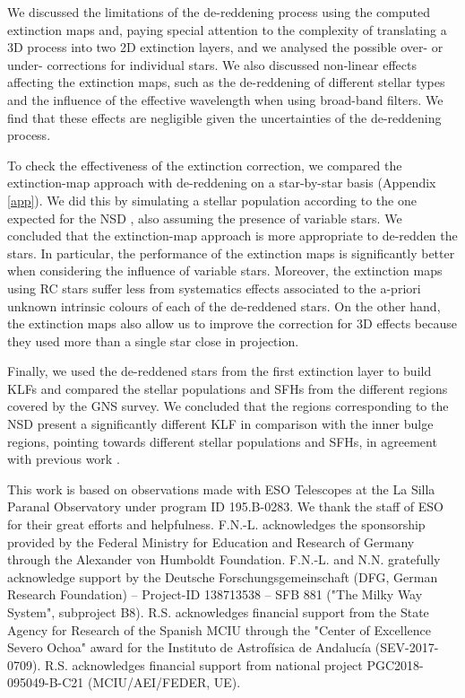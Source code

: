 \documentclass{aa}
\begin{document}
We discussed the limitations of the de-reddening process using the computed extinction maps and, paying special attention to the complexity of translating a 3D process into two 2D extinction layers, and we analysed the possible over- or under- corrections for individual stars. We also discussed non-linear effects affecting the extinction maps, such as the de-reddening of different stellar types and the influence of the effective wavelength when using broad-band filters. We find that these effects are negligible given the uncertainties of the de-reddening process.

To check the effectiveness of the extinction correction, we compared the extinction-map approach with de-reddening on a star-by-star basis (Appendix\,\ref{app}). We did this by simulating a stellar population according to the one expected for the NSD \citep{Nogueras-Lara:2019ad}, also assuming  the presence of variable stars. We concluded that the extinction-map approach is more appropriate to de-redden the stars. In particular, the performance of the extinction maps is significantly better when considering the influence of variable stars. Moreover, the extinction maps using RC stars  suffer less from systematics effects associated to the a-priori unknown intrinsic colours of each of the de-reddened stars. On the other hand, the extinction maps also allow us to improve the correction for 3D effects because they used more than a single star close in projection. 


Finally, we used the de-reddened stars from the first extinction layer to build KLFs and compared the stellar populations and SFHs from the different regions covered by the GNS survey. We concluded that the regions corresponding to the NSD present a significantly different KLF in comparison with the inner bulge regions, pointing towards different stellar populations and SFHs, in agreement with previous work \citep{Launhardt:2002nx,Nishiyama:2013uq,Nogueras-Lara:2018ab,gallego-cano2019,Nogueras-Lara:2019ad}.









  \begin{acknowledgements}
      This work is based on observations made with ESO
      Telescopes at the La Silla Paranal Observatory under program
      ID 195.B-0283. We thank the staff of
      ESO for their great efforts and helpfulness. F.N.-L. acknowledges the sponsorship provided by the Federal Ministry for Education and Research of Germany through the Alexander von Humboldt Foundation. F.N.-L. and N.N. gratefully acknowledge support by the Deutsche Forschungsgemeinschaft (DFG, German Research Foundation) – Project-ID 138713538 – SFB 881 ("The Milky Way System", subproject B8). R.S. acknowledges financial support from the State
Agency for Research of the Spanish MCIU through the "Center of Excellence Severo
Ochoa" award for the Instituto de Astrof\'isica de Andaluc\'ia (SEV-2017-0709). R.S.  acknowledges financial support from national project
PGC2018-095049-B-C21 (MCIU/AEI/FEDER, UE).
\end{acknowledgements}
\end{document}
